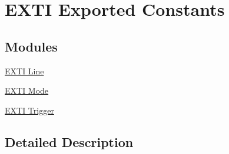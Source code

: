 \hypertarget{group___e_x_t_i___exported___constants}{}\section{E\+X\+TI Exported Constants}
\label{group___e_x_t_i___exported___constants}
\subsection*{Modules}
\begin{DoxyCompactItemize}
\item 
\hyperlink{group___e_x_t_i___line}{E\+X\+T\+I Line}
\item 
\hyperlink{group___e_x_t_i___mode}{E\+X\+T\+I Mode}
\item 
\hyperlink{group___e_x_t_i___trigger}{E\+X\+T\+I Trigger}
\end{DoxyCompactItemize}


\subsection{Detailed Description}
